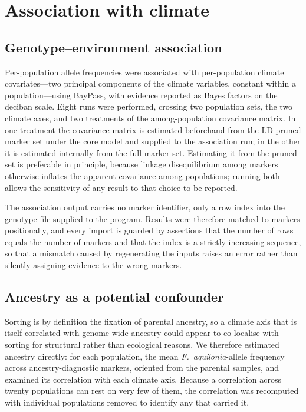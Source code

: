 \documentclass[11pt]{article}
\newcommand{\Faq}{\textit{F.~aquilonia}}
\begin{document}
\section{Association with climate}
\label{sec:climate}

\subsection{Genotype--environment association}
Per-population allele frequencies were associated with per-population climate
covariates---two principal components of the climate variables, constant within
a population---using BayPass, with evidence reported as Bayes factors on the
deciban scale. Eight runs were performed, crossing two population sets, the two
climate axes, and two treatments of the among-population covariance matrix. In
one treatment the covariance matrix is estimated beforehand from the LD-pruned
marker set under the core model and supplied to the association run; in the
other it is estimated internally from the full marker set. Estimating it from
the pruned set is preferable in principle, because linkage disequilibrium among
markers otherwise inflates the apparent covariance among populations; running
both allows the sensitivity of any result to that choice to be reported.

The association output carries no marker identifier, only a row index into the
genotype file supplied to the program. Results were therefore matched to markers
positionally, and every import is guarded by assertions that the number of rows
equals the number of markers and that the index is a strictly increasing
sequence, so that a mismatch caused by regenerating the inputs raises an error
rather than silently assigning evidence to the wrong markers.

\subsection{Ancestry as a potential confounder}
Sorting is by definition the fixation of parental ancestry, so a climate axis
that is itself correlated with genome-wide ancestry could appear to co-localise
with sorting for structural rather than ecological reasons. We therefore
estimated ancestry directly: for each population, the mean \Faq-allele frequency
across ancestry-diagnostic markers, oriented from the parental samples, and
examined its correlation with each climate axis. Because a correlation across
twenty populations can rest on very few of them, the correlation was recomputed
with individual populations removed to identify any that carried it.
\end{document}
